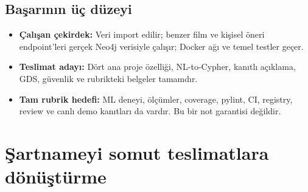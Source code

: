 \documentclass[11pt,a4paper]{article}
\begin{document}
\subsection{Başarının üç düzeyi}
\begin{itemize}
\item \textbf{Çalışan çekirdek:} Veri import edilir; benzer film ve kişisel öneri endpoint'leri gerçek Neo4j verisiyle çalışır; Docker ağı ve temel testler geçer.
\item \textbf{Teslimat adayı:} Dört ana proje özelliği, NL-to-Cypher, kanıtlı açıklama, GDS, güvenlik ve rubrikteki belgeler tamamdır.
\item \textbf{Tam rubrik hedefi:} ML deneyi, ölçümler, coverage, pylint, CI, registry, review ve canlı demo kanıtları da vardır. Bu bir not garantisi değildir.
\end{itemize}

\section{Şartnameyi somut teslimatlara dönüştürme}
\end{document}

